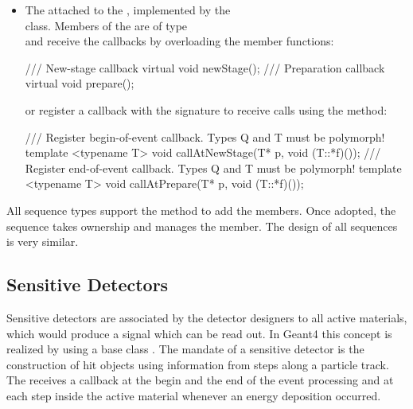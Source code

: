 \begin{itemize}
\item The  attached to the 
    {}, implemented by the \\
     class.
    Members of the  are of type\\
    {} and receive the callbacks by overloading the member functions:
\begin{unnumberedcode}
/// New-stage callback
virtual void newStage();
/// Preparation callback
virtual void prepare();
\end{unnumberedcode}
    or register a callback with the signature {}
    to receive calls using the method:
\begin{unnumberedcode}
/// Register begin-of-event callback. Types Q and T must be polymorph!
template <typename T> void callAtNewStage(T* p, void (T::*f)());
/// Register end-of-event callback. Types Q and T must be polymorph!
template <typename T> void callAtPrepare(T* p, void (T::*f)());
\end{unnumberedcode}
\end{itemize}

\noindent
All sequence types support the method 
to add the members. Once adopted, the sequence takes ownership and manages
the member. The design of all sequences is very similar. 

\subsection{Sensitive Detectors}
\label{sec:ddg4-user-manual-geant4sensitivedetectors}

\noindent
Sensitive detectors are associated by the detector designers to all active 
materials, which would produce a signal which can be read out. In Geant4 this concept
is realized by using a base class .
The mandate of a sensitive detector is the construction of hit objects 
using information from steps along a particle track. 
The  receives 
a callback at the begin and the end of the event processing and at each step
inside the active material whenever an energy deposition occurred.

